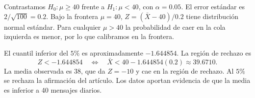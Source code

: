 Contrastamos $H_0:\mu\ge40$ frente a $H_1:\mu<40$, con
$\alpha=0.05$. El error estándar es $2/\sqrt{100}=0.2$.
Bajo la frontera $\mu=40$, $Z=(\bar X-40)/0.2$ tiene distribución
normal estándar. Para cualquier $\mu>40$ la probabilidad de caer
en la cola izquierda es menor, por lo que calibramos en la frontera.

El cuantil inferior del $5\%$ es aproximadamente $-1.644854$.
La región de rechazo es
\[
Z<-1.644854\quad\Longleftrightarrow\quad
\bar X<40-1.644854(0.2)\approx\boxed{39.6710}.
\]
La media observada es 38, que da $Z=-10$ y cae en la región de
rechazo. Al $5\%$ se rechaza la afirmación del artículo. Los datos
aportan evidencia de que la media es inferior a 40 mensajes diarios.
